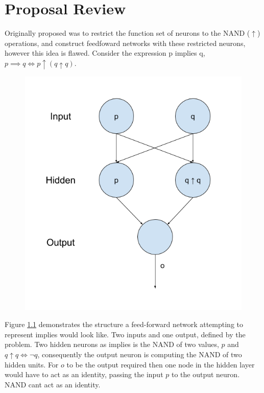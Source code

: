 \chapter{Proposal Review}\label{C:proposalreview}
Originally proposed was to restrict the function set of neurons to the NAND ($\uparrow$) operations, and construct feedfoward networks with these restricted neurons, however this idea is flawed. Consider the expression p implies q, $p \implies q \iff p \uparrow (q \uparrow q)$.

\begin{figure}[H]
  \centering
  \begin{minipage}[b]{0.6\textwidth}
    \includegraphics[width=\textwidth]{implys-nand-net.png}
    \caption{}
    \label{fig:implys-nand-net}
  \end{minipage}
  \hfill
\end{figure}

Figure \ref{fig:implys-nand-net} demonstrates the structure a feed-forward network attempting to represent implies would look like. Two inputs and one output, defined by the problem. Two hidden neurons as implies is the NAND of two values, $p$ and $q \uparrow q \iff \lnot q$, consequently the output neuron is computing the NAND of two hidden units. For $o$ to be the output required then one node in the hidden layer would have to act as an identity, passing the input $p$ to the output neuron. NAND cant act as an identity.